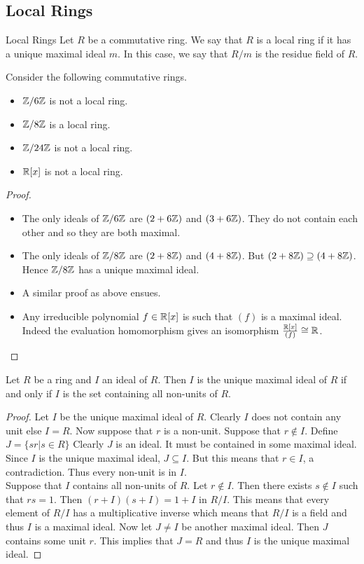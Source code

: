 \documentclass[a4paper]{article}
\begin{document}
\subsection{Local Rings}
\begin{defn}{Local Rings}{} Let $R$ be a commutative ring. We say that $R$ is a local ring if it has a unique maximal ideal $m$. In this case, we say that $R/m$ is the residue field of $R$. 
\end{defn}

\begin{eg}{}{} Consider the following commutative rings. 
\begin{itemize}
\item $\mathbb{Z}/6\mathbb{Z}$ is not a local ring. 
\item $\mathbb{Z}/8\mathbb{Z}$ is a local ring. 
\item $\mathbb{Z}/24\mathbb{Z}$ is not a local ring. 
\item $\mathbb{R}[x]$ is not a local ring. 
\end{itemize} 
\begin{proof}~\\
\begin{itemize}
\item The only ideals of $\mathbb{Z}/6\mathbb{Z}$ are $(2+6\mathbb{Z})$ and $(3+6\mathbb{Z})$. They do not contain each other and so they are both maximal. 
\item The only ideals of $\mathbb{Z}/8\mathbb{Z}$ are $(2+8\mathbb{Z})$ and $(4+8\mathbb{Z})$. But $(2+8\mathbb{Z})\supseteq(4+8\mathbb{Z})$. Hence $\mathbb{Z}/8\mathbb{Z}$ has a unique maximal ideal. 
\item A similar proof as above ensues. 
\item Any irreducible polynomial $f\in\mathbb{R}[x]$ is such that $(f)$ is a maximal ideal. Indeed the evaluation homomorphism gives an isomorphism $\frac{\mathbb{R}[x]}{(f)}\cong\mathbb{R}$. 
\end{itemize}
\end{proof}
\end{eg}

\begin{prp}{}{} Let $R$ be a ring and $I$ an ideal of $R$. Then $I$ is the unique maximal ideal of $R$ if and only if $I$ is the set containing all non-units of $R$. 
\begin{proof}
Let $I$ be the unique maximal ideal of $R$. Clearly $I$ does not contain any unit else $I=R$. Now suppose that $r$ is a non-unit. Suppose that $r\notin I$. Define $J=\{sr|s\in R\}$ Clearly $J$ is an ideal. It must be contained in some maximal ideal. Since $I$ is the unique maximal ideal, $J\subseteq I$. But this means that $r\in I$, a contradiction. Thus every non-unit is in $I$. \\
Suppose that $I$ contains all non-units of $R$. Let $r\notin I$. Then there exists $s\notin I$ such that $rs=1$. Then $(r+I)(s+I)=1+I$ in $R/I$. This means that every element of $R/I$ has a multiplicative inverse which means that $R/I$ is a field and thus $I$ is a maximal ideal. Now let $J\neq I$ be another maximal ideal. Then $J$ contains some unit $r$. This implies that $J=R$ and thus $I$ is the unique maximal ideal. 
\end{proof}
\end{prp}
\end{document}
